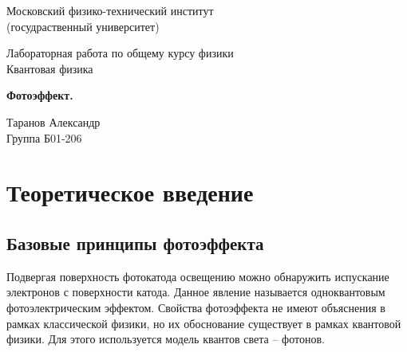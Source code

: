 \documentclass[a4paper, 12pt]{article} %
\begin{document}
	
	\begin{titlepage}
		
		\newpage
		\begin{center}
			\normalsize Московский физико-технический институт \\(госудраственный университет)
		\end{center}
		
		\vspace{6em}
		
		\begin{center}
			\Large Лабораторная работа по общему курсу физики\\Квантовая физика
		\end{center}
		
		\vspace{1em}
		
		\begin{center}
			\Large \textbf{Фотоэффект.}
		\end{center}
		
		\vspace{2em}
		
		\begin{center}
			\large Таранов Александр \\
			Группа Б01-206
		\end{center}
		
		\vspace{\fill}
		
	\end{titlepage}
	
	
	
	\thispagestyle{empty}
	\newpage
	\tableofcontents
	\newpage
	\setcounter{page}{1}

	\section{Теоретическое введение}
	
	\subsection{Базовые принципы фотоэффекта}
	
	Подвергая поверхность фотокатода освещению можно обнаружить испускание электронов с поверхности катода. Данное явление называется одноквантовым фотоэлектрическим эффектом.
	Свойства фотоэффекта не имеют объяснения в рамках классической физики, но их обоснование существует в рамках квантовой физики. Для этого используется модель квантов света -- фотонов.
	
\end{document}
